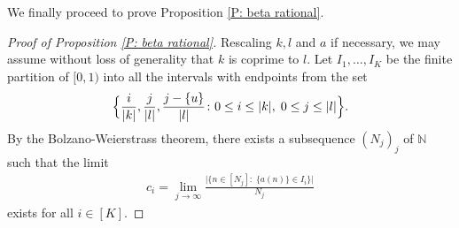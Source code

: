 \documentclass[11pt]{amsart}
\theoremstyle{definition}
\newcommand{\Q}{{\mathbb Q}}
\newcommand{\1}{{\mathbf{1}}}
\newcommand{\floor}[1]{{\left \lfloor #1 \right \rfloor}}
\begin{document}
We finally proceed to prove Proposition \ref{P: beta rational}.
\begin{proof}[Proof of Proposition \ref{P: beta rational}]
Rescaling $k,l$ and $a$ if necessary, we may assume without loss of generality that $k$ is coprime to $l$. Let $I_1, \ldots, I_K$ be the finite partition of $[0,1)$ into all the intervals with endpoints from the set
    \begin{align}\label{E: endpoints}
        \Bigl\{\frac{i}{\vert k\vert},\frac{j}{\vert l\vert}, \frac{j-\{u\}}{\vert l\vert}\colon 0\leq i\leq \vert k\vert,\; 0\leq j\leq \vert l\vert\Bigr\}.
    \end{align}
By the Bolzano-Weierstrass theorem, there exists a subsequence $(N_j)_j$ of $\mathbb{N}$ such that
the limit 
\begin{align}\label{E: weights}
    c_i =\lim_{j\to\infty}\frac{\vert\{n\in[N_j]\colon\; \{a(n)\}\in I_i\}\vert}{N_{j}}
\end{align}
    exists for all $i\in[K]$.




\end{proof}
\end{document}
